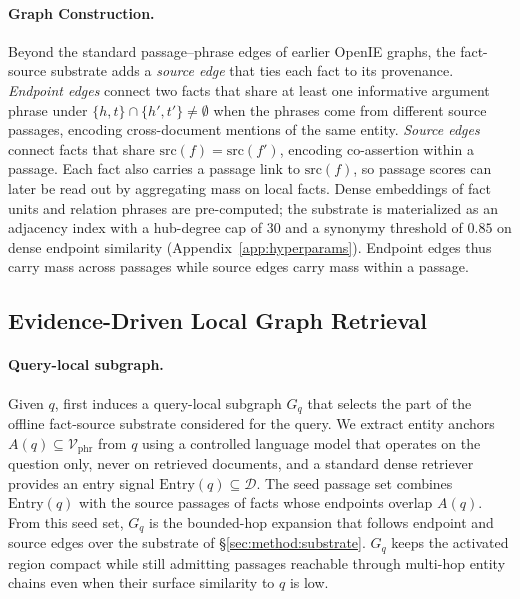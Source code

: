 \paragraph{Graph Construction.}
Beyond the standard passage--phrase edges of earlier OpenIE
graphs, the fact-source substrate adds a \emph{source edge} that
ties each fact to its provenance. \emph{Endpoint edges} connect
two facts that share at least one informative argument phrase
under $\{h,t\}\cap\{h',t'\}\neq\emptyset$ when the phrases come
from different source passages, encoding cross-document mentions
of the same entity. \emph{Source edges} connect facts that share
$\mathrm{src}(f)=\mathrm{src}(f')$, encoding co-assertion within a
passage. Each fact also carries a passage link to $\mathrm{src}(f)$,
so passage scores can later be read out by aggregating mass on
local facts. Dense embeddings of fact units and relation phrases
are pre-computed; the substrate is materialized as an adjacency
index with a hub-degree cap of $30$ and a synonymy threshold of
$0.85$ on dense endpoint similarity
(Appendix~\ref{app:hyperparams}). Endpoint edges thus carry mass
across passages while source edges carry mass within a passage.

\subsection{Evidence-Driven Local Graph Retrieval}
\label{sec:method:retrieval}

\paragraph{Query-local subgraph.}
Given $q$, \methodname{} first induces a query-local subgraph $G_q$
that selects the part of the offline fact-source substrate
considered for the query. We extract entity anchors
$A(q) \subseteq \mathcal{V}_{\mathrm{phr}}$ from $q$ using a
controlled language model that operates on the question only,
never on retrieved documents, and a standard dense retriever
provides an entry signal $\mathrm{Entry}(q) \subseteq \mathcal{D}$.
The seed passage set combines $\mathrm{Entry}(q)$ with the source
passages of facts whose endpoints overlap $A(q)$. From this seed
set, $G_q$ is the bounded-hop expansion that follows endpoint and
source edges over the substrate of \S\ref{sec:method:substrate}.
$G_q$ keeps the activated region compact while still admitting
passages reachable through multi-hop entity chains even when their
surface similarity to $q$ is low.

